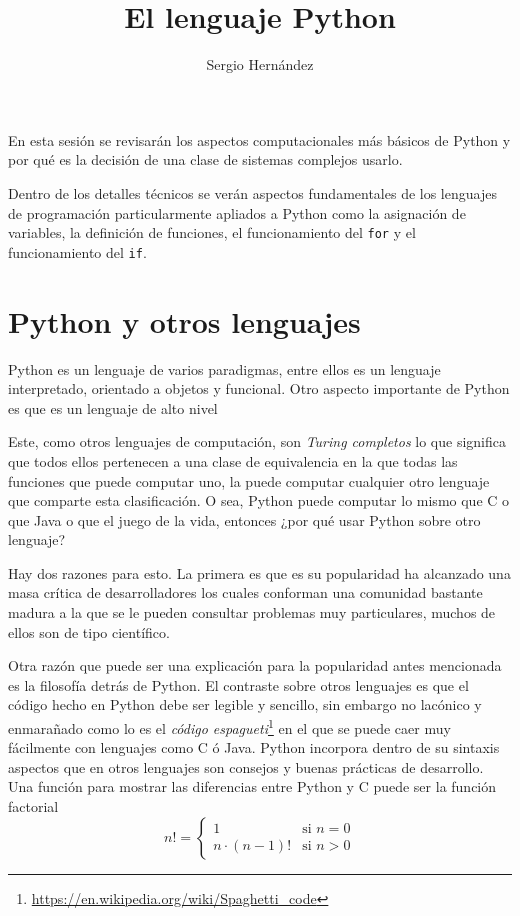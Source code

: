 \documentclass{report}
\title{El lenguaje Python}
\author{Sergio Hernández}
\date{}
\begin{document}
\maketitle

En esta sesión se revisarán los aspectos computacionales más básicos de Python y
por qué es la decisión de una clase de sistemas complejos usarlo. 

Dentro de los detalles técnicos se verán aspectos fundamentales de 
los lenguajes de programación particularmente apliados a Python como
la asignación de variables, la definición de funciones, el funcionamiento
del {\tt{for}} y el funcionamiento del {\tt{if}}.

\section{Python y otros lenguajes}

Python es un lenguaje de varios paradigmas, entre ellos es un lenguaje 
interpretado, orientado a objetos y funcional. Otro aspecto 
importante de Python es que es un lenguaje de alto nivel \cite{wikipython, 
httlcs}

Este, como otros lenguajes de computación, son {\it{Turing completos}} lo que
significa que todos ellos pertenecen a una clase de equivalencia en la que todas
las funciones que puede computar uno, la puede computar cualquier otro lenguaje
que comparte esta clasificación. O sea, Python puede computar lo mismo que C o
que Java o que el juego de la vida, entonces ¿por qué usar Python sobre otro 
lenguaje?

Hay dos razones para esto. La primera es que es su popularidad ha alcanzado una
masa crítica de desarrolladores los cuales conforman una comunidad bastante 
madura a la que se le pueden consultar problemas muy particulares, muchos de
ellos son de tipo científico. 

Otra razón que puede ser una explicación para la popularidad antes mencionada
es la filosofía detrás de Python. El contraste sobre otros lenguajes es que el 
código hecho en Python debe ser legible y sencillo, sin embargo no lacónico
y enmarañado como lo es el {\it{código espagueti}}\footnote{\url{https://en.wikipedia.org/wiki/Spaghetti_code}} 
en el que se puede caer muy fácilmente con lenguajes como C ó Java. Python 
incorpora dentro de su sintaxis aspectos que en otros lenguajes son consejos
y buenas prácticas de desarrollo. Una función para mostrar las diferencias 
entre Python y C puede ser la función factorial
\[
n! = \left\{
            \begin{array}{ll}
                    1              & \mbox{si } n = 0 \\
                    n\cdot(n-1)! & \mbox{si } n > 0
            \end{array}
     \right.
\]
\end{document}
